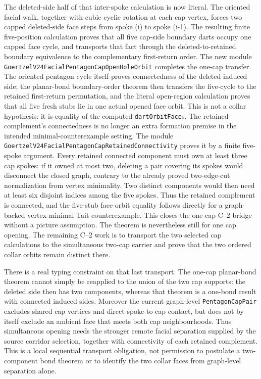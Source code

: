 \documentclass[11pt]{article}
\theoremstyle{definition}
\begin{document}
The deleted-side half of that inter-spoke calculation is now literal.  The
oriented facial walk, together with cubic cyclic rotation at each cap vertex,
forces two capped deleted-side face steps from spoke (i) to spoke (i-1).
The resulting finite five-position calculation proves that all five cap-side
boundary darts occupy one capped face cycle, and transports that fact through
the deleted-to-retained boundary equivalence to the complementary first-return
order.  The new module
\texttt{GoertzelV24FacialPentagonCapOpenHoleOrbit} completes the one-cap
transfer.  The oriented pentagon cycle itself proves connectedness of the
deleted induced side; the planar-bond boundary-order theorem then transfers
the five-cycle to the retained first-return permutation, and the literal
open-region calculation proves that all five fresh stubs lie in one actual
opened face orbit.  This is not a collar hypothesis: it is equality of the
computed \texttt{dartOrbitFace}s.  The retained complement's connectedness is
no longer an extra formation premise in the intended minimal-counterexample
setting.  The module
\texttt{GoertzelV24FacialPentagonCapRetainedConnectivity} proves it by a finite
five-spoke argument.  Every retained connected component must own at least
three cap spokes: if it owned at most two, deleting a pair covering its spokes
would disconnect the closed graph, contrary to the already proved two-edge-cut
normalization from vertex minimality.  Two distinct components would then need
at least six disjoint indices among the five spokes.  Thus the retained
complement is connected, and the five-stub face-orbit equality follows directly
for a graph-backed vertex-minimal Tait counterexample.  This closes the one-cap
C--2 bridge without a picture assumption.  The theorem is nevertheless still
for one cap opening.  The remaining C--2 work is to transport the two selected
cap calculations to the simultaneous two-cap carrier and prove that the two
ordered collar orbits remain distinct there.

There is a real typing constraint on that last transport.  The one-cap
planar-bond theorem cannot simply be reapplied to the union of the two cap
supports: the deleted side then has two components, whereas that theorem is a
one-bond result with connected induced sides.  Moreover the current
graph-level \texttt{PentagonCapPair} excludes shared cap vertices and direct
spoke-to-cap contact, but does not by itself exclude an ambient face that
meets both cap neighbourhoods.  Thus simultaneous opening needs the stronger
remote facial separation supplied by the source corridor selection, together
with connectivity of each retained complement.  This is a local sequential
transport obligation, not permission to postulate a two-component bond
theorem or to identify the two collar faces from graph-level separation alone.
\end{document}
